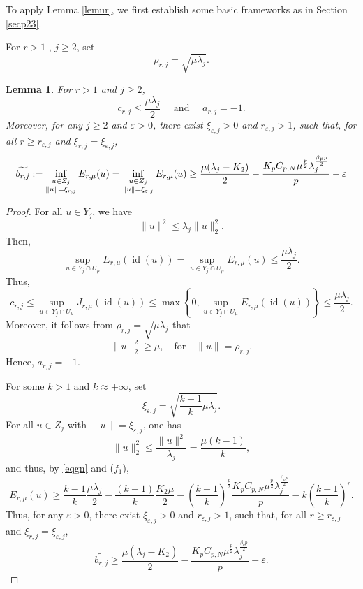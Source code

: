\documentclass[11pt]{amsart}
\newtheorem{lemma}[theorem]{Lemma}
\newcommand{\norm}[1]{\lVert#1\rVert}
\numberwithin{equation}{section}
\begin{document}
To apply Lemma \ref{lemur},  we first establish some basic frameworks as in Section \ref{secp23}.


For $r>1$ , $j \geq 2$, set
    $$\rho_{r,j}= \sqrt{\mu\lambda_{j} }.$$
\begin{lemma}\label{lemfountain}
    For $r>1$ and $j \geq 2$,
    $$c_{r,j} \leq \frac{\mu \lambda_{j}}{2} \quad \text{ and } \quad a_{r,j}=-1.$$
Moreover, for any $j \geq 2$ and $\varepsilon>0$, there exist $\xi_{\varepsilon,j}>0$ and $r_{\varepsilon,j}>1$, such that, for all $r\geq r_{\varepsilon,j}$ and $\xi_{r,j}=\xi_{\varepsilon,j}$,
$$
\widetilde{b_{r,j}}:=\inf_{\begin{subarray}{c} u \in Z_j \\ \norm{u}= \xi_{r,j}\end{subarray}} E_{r,\mu}(u) = \inf_{\begin{subarray}{c} u \in Z_j \\ \norm{u}= \xi_{\varepsilon,j}\end{subarray}} E_{r,\mu}(u)  \geq
\frac{\mu(\lambda_{j}-K_2)}{2}-\frac{K_pC_{p,N}\mu^\frac{p}{2}\lambda_{j}^\frac{\beta_pp}{2}}{p}-\varepsilon
$$
\end{lemma}
\begin{proof}
For all $u \in Y_j$, we have
$$
\norm{u}^2\leq \lambda_{j} \norm{u}^2_2.
$$
Then,
$$
\sup_{u \in Y_j \cap U_\mu}E_{r,\mu}(\operatorname{id}(u)) = \sup_{u \in Y_j \cap U_\mu}E_{r,\mu}(u) \leq \frac{\mu\lambda_{j}}{2}.
$$
Thus,
$$
c_{r,j} \leq \sup_{u \in Y_j \cap U_\mu}J_{r,\mu}(\operatorname{id}(u)) \leq \max\left\{0, \sup_{u \in Y_j \cap U_\mu}E_{r,\mu}(\operatorname{id}(u))\right\} \leq \frac{\mu \lambda_{j}}{2}.
$$
Moreover, it follows from $\rho_{r,j}= \sqrt{\mu\lambda_{j} }$ that
    $$
     \norm{u}^2_2 \geq \mu, \quad \mbox{for} \quad \|u\|=\rho_{r,j}.
    $$
Hence, $a_{r,j}=-1$.

For some $k>1$ and $k\approx +\infty$, set
$$
\xi_{\varepsilon,j}= \sqrt{\frac{k-1}{k}\mu\lambda_{j} }.
$$
For all $u \in Z_j$ with $\norm{u}=\xi_{\varepsilon,j}$, one has
    $$
     \norm{u}^2_2 \leq \frac{\norm{u}^2}{\lambda_{j}} = \frac{\mu(k-1)}{k},
    $$
and thus, by \eqref{eqgn} and ($f_1$),
$$
E_{r,\mu}(u)\geq \frac{k-1}{k}\frac{\mu\lambda_{j}}{2}-\frac{(k-1)}{k}\frac{K_2\mu}{2}-\left(\frac{k-1}{k}\right)^\frac{p}{2}\frac{K_pC_{p,N}\mu^\frac{p}{2}\lambda_{j}^\frac{\beta_pp}{2}}{p}- k\left(\frac{k-1}{k}\right)^r.
$$
Thus, for any $\varepsilon>0$, there exist $\xi_{\varepsilon,j}>0$ and $r_{\varepsilon,j}>1$, such that, for all $r\geq r_{\varepsilon,j}$ and $\xi_{r,j}=\xi_{\varepsilon,j}$,
$$
\widetilde{b_{r,j}}\geq \frac{\mu(\lambda_{j}-K_2)}{2}-\frac{K_pC_{p,N}\mu^\frac{p}{2}\lambda_{j}^\frac{\beta_pp}{2}}{p}-\varepsilon.
$$
\end{proof}
\end{document}
